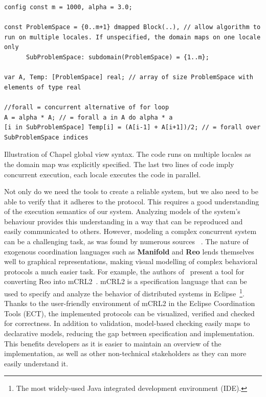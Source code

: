 \begin{listing}[t!]
\footnotesize
\begin{verbatim}
config const m = 1000, alpha = 3.0;

const ProblemSpace = {0..m+1} dmapped Block(..), // allow algorithm to run on multiple locales. If unspecified, the domain maps on one locale only
      SubProblemSpace: subdomain(ProblemSpace) = {1..m}; 

var A, Temp: [ProblemSpace] real; // array of size ProblemSpace with elements of type real

//forall = concurrent alternative of for loop
A = alpha * A; // = forall a in A do alpha * a 
[i in SubProblemSpace] Temp[i] = (A[i-1] + A[i+1])/2; // = forall over SubProblemSpace indices
\end{verbatim}
\caption{Illustration of Chapel global view syntax. The code runs on multiple locales as the domain map was explicitly specified. The last two lines of code imply concurrent execution, each locale executes the code in parallel.}
\label{lst:globalView}
\end{listing}

Not only do we need the tools to create a reliable system, but we also need to be able to verify that it adheres to the protocol. This requires a good understanding of the execution semantics of our system. Analyzing models of the system's behaviour provides this understanding in a way that can be reproduced and easily communicated to others. However, modeling a complex concurrent system can be a challenging task, as was found by numerous sources ~\cite{modelConcurrentProblems,Fokkink2007ModellingDS, concurrentBMCModel}. The nature of exogenous coordination languages such as \textbf{Manifold} and \textbf{Reo} lends themselves well to graphical representations, making visual modelling of complex behavioral protocols a much easier task. For example, the authors of~\cite{model-reo} present a tool for converting Reo into mCRL2~\cite{mcrl2}. mCRL2 is a specification language that can be used to specify and analyze the behavior of distributed systems in Eclipse~\footnote{The most widely-used Java integrated development environment (IDE).}. Thanks to the user-friendly environment of mCRL2 in the Eclipse Coordination Tools (ECT), the implemented protocols can be visualized, verified and checked for correctness. In addition to validation, model-based checking easily maps to declarative models, reducing the gap between specification and implementation. This benefits developers as it is easier to maintain an overview of the implementation, as well as other non-technical stakeholders as they can more easily understand it.

